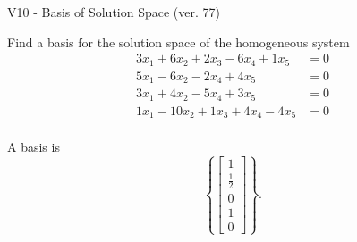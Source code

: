 \begin{exercise}
  \begin{exerciseTitle}V10 - Basis of Solution Space (ver. 77)\end{exerciseTitle}
  \begin{exerciseStatement}
    Find a basis for the solution space of the homogeneous system 
\begin{align*}
 3 x_ 1 + 6 x_ 2 + 2 x_ 3 -6 x_ 4 + 1 x_ 5 &= 0  \\ 
  5 x_ 1 -6 x_ 2 -2 x_ 4 + 4 x_ 5 &= 0  \\ 
  3 x_ 1 + 4 x_ 2 -5 x_ 4 + 3 x_ 5 &= 0  \\ 
  1 x_ 1 -10 x_ 2 + 1 x_ 3 + 4 x_ 4 -4 x_ 5 &= 0  \\ 
 \end{align*}


 
  \end{exerciseStatement}

  \begin{exerciseAnswer}
   A basis is   
\[\left\{\left[\begin{array}{c}
1 \\
\frac{1}{2} \\
0 \\
1 \\
0
\end{array}\right]\right\}.\]

  


  \end{exerciseAnswer}
\end{exercise}